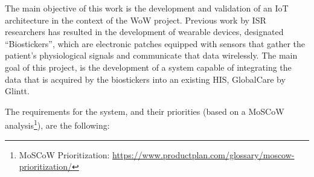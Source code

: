 The main objective of this work is the development and validation of an \acs{IoT} architecture in the context of the \acs{WoW} project. Previous work by \acs{ISR} researchers has resulted in the development of wearable devices, designated ``Biostickers'', which are electronic patches equipped with sensors that gather the patient's physiological signals and communicate that data wirelessly. The main goal of this project, is the development of a system capable of integrating the data that is acquired by the biostickers into an existing \acs{HIS}, GlobalCare by Glintt. 

The requirements for the system, and their priorities (based on a MoSCoW analysis\footnote{MoSCoW Prioritization: \url{https://www.productplan.com/glossary/moscow-prioritization/}}), are the following: 






